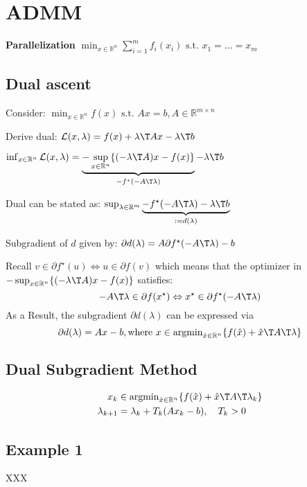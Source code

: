 \section{ADMM}

\textbf{Parallelization}
$\min_{x\in\mathbb{R}^{n}}
	\sum_{i = 1}^{m} f_i(x_i)
	\text{ s.t. }x_1=\dots=x_m$

\subsection{Dual ascent}

Consider:
$\min_{x \in \mathbb{R}^{n}} f(x)
	\text{ s.t. } Ax=b, A \in \mathbb{R}^{m\times n}$

Derive dual:
$\mathcal{L}(x,\lambda) = f(x) + \lambda\T Ax-\lambda\T  b$

$\inf_{x \in \mathbb{R}^n}\mathcal{L}(x,\lambda) =
	\underbrace{-\sup_{x\in\mathbb{R}^n}\{(-\lambda\T A)x-f(x)\}}
	_{-f^\star(-A\T\lambda)}
	-\lambda\T b$

Dual can be stated as:
$\sup_{\lambda\in\mathbb{R}^m}
	\underbrace{-f^\star(-A\T\lambda)-\lambda\T b}
	_{:=d(\lambda)}$

Subgradient of $d$ given by:
$\partial d(\lambda)=A\partial f^\star(-A\T\lambda)-b$

Recall
$v\in\partial f^\star(u) \Leftrightarrow u\in\partial f(v)$
which means that the optimizer in
$-\sup_{x\in\mathbb{R}^n}\{(-\lambda\T A)x-f(x)\}$
satisfies:
$$
	-A\T\lambda\in\partial f(x^\star)
	\Leftrightarrow
	x^\star\in\partial f^\star(-A\T\lambda)
$$
As a Result, the subgradient $\partial d(\lambda)$ can be expressed via
$$
	\partial d(\lambda)=Ax-b, \text{where }
	x\in\operatorname{argmin}_{\hat{x}\in\mathbb{R}^{n}}
	\{ f(\hat{x})+\hat{x}\T A\T\lambda \}
$$

\subsection{Dual Subgradient Method}

$$\begin{aligned}
		x_k           & \in\operatorname{argmin}_{\hat{x}\in\mathbb{R}^{n}}
		\{ f(\hat{x})+\hat{x}\T A\T\lambda_k\}
		\\
		\lambda_{k+1} & =\lambda_k+T_k(Ax_k-b),\quad T_k>0
	\end{aligned} $$

\subsection{Example 1}
XXX
%
%
%
%


